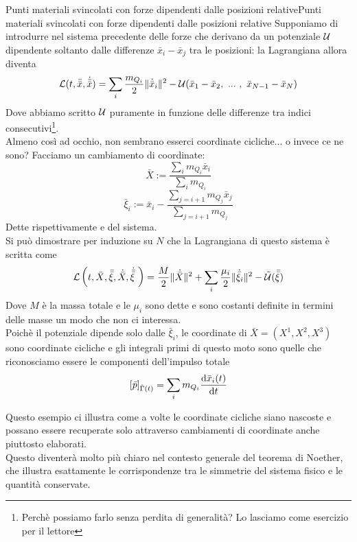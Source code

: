 \documentclass[openany]{book}
\begin{document}
\begin{example}{Punti materiali svincolati con forze dipendenti dalle posizioni relative}{Punti materiali svincolati con forze dipendenti dalle posizioni relative}
    Supponiamo di introdurre nel sistema precedente delle forze che derivano da un potenziale $\mathcal{U}$ dipendente soltanto dalle differenze $\bar x_i -\bar x_j$ tra le posizioni: la Lagrangiana allora diventa 
    \[ \L(t,\bar{\bar x},\dot{\bar{\bar x}})  = \sum_i \frac{m_{Q_i}}{2}\| \dot{\bar x}_i \|^2 - \U(\bar x_1 - \bar x_2,\ ...\ ,\  \bar x_{N-1} - \bar x_N)\]
    Dove abbiamo scritto $\mathcal{U}$ puramente in funzione delle differenze tra indici consecutivi\footnote{Perchè possiamo farlo senza perdita di generalità? Lo lasciamo come esercizio per il lettore}.\\
    Almeno così ad occhio, non sembrano esserci coordinate cicliche... o invece ce ne sono? Facciamo un cambiamento di coordinate: 
    \[ \bar X := \frac{ \sum_i m_{Q_i}\bar x_i }{\sum_i m_{Q_i}} \]
    \[ \bar\xi_i := \bar x_i - \frac{ \sum_{j = i+1} m_{Q_j}\bar x_j }{\sum_{j=i+1} m_{Q_j}} \]
    Dette rispettivamente  e  del sistema.\\
    Si può dimostrare per induzione su $N$ che la Lagrangiana di questo sistema è scritta come 
    \[ \mathcal{L}\left(t,\bar X, \bar{\bar \xi}, \dot{\bar X}, \dot{\bar{\bar\xi}}\ \right) = \frac{M}{2}\| \dot{\bar X} \|^2 + \sum_i \frac{\mu_i}{2} \|\dot{\bar\xi}_i\|^2 - \tilde{\mathcal{U}}(\bar{\bar\xi}) \]
    Dove $M$ è la massa totale e le $\mu_i$ sono dette  e sono costanti definite in termini delle masse un modo che non ci interessa.\\
    Poichè il potenziale dipende solo dalle $\bar\xi_i$, le coordinate di $\bar X=(X^1,X^2,X^3)$ sono coordinate cicliche e gli integrali primi di questo moto sono quelle che riconosciamo essere le componenti dell'impulso totale 
    \[ [\bar p]_{\hat\Gamma(t)} = \sum_i m_{Q_i} \frac{\text{d} \bar x_i(t)}{\text{d} t} \]
\end{example}

Questo esempio ci illustra come a volte le coordinate cicliche siano nascoste e possano essere recuperate solo attraverso cambiamenti di coordinate anche piuttosto elaborati.\\
Questo diventerà molto più chiaro nel contesto generale del teorema di Noether, che illustra esattamente le corrispondenze tra le simmetrie del sistema fisico e le quantità conservate.

\newpage
\newcommand\loc{\text{loc}}
\end{document}
